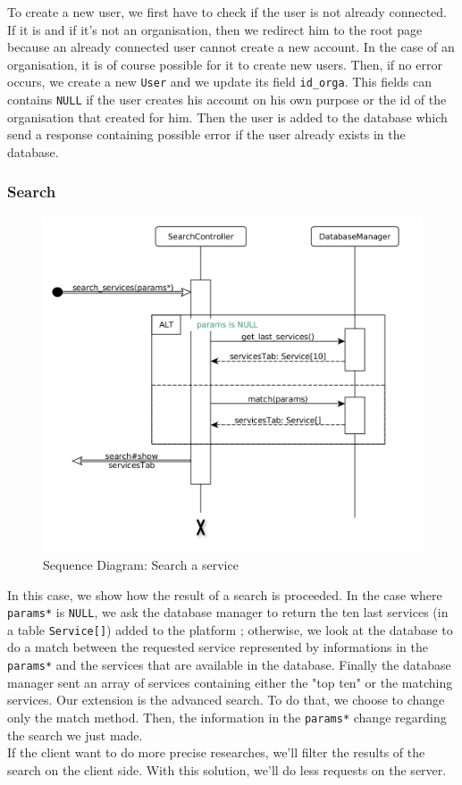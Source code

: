 To create a new user, we first have to check if the user is not already connected. If it is and if it's
not an organisation, then we redirect him to the root page because an already connected user cannot 
create a new account. In the case of an organisation, it is of course possible 
for it to create new users. Then, if no error occurs, we create a new \texttt{User} and we update its field \texttt{id\_orga}. This fields can contains \texttt{NULL} if the user creates his account on his own purpose or the id of the organisation that created for him. Then the user is added to the
database which send a response containing  possible error if the user already exists in the database.

\subsubsection{Search}

\begin{figure}[H]
	\begin{center}
		\includegraphics[width=.55\textwidth]{search_a_service.png} %
		\caption{Sequence Diagram: Search a service}
		\label{fig:searchservice}
	\end{center}
\end{figure}

In this case, we show how the result of a search is proceeded. In the case where \texttt{params*} is \texttt{NULL}, we ask the database manager to return the ten last services (in a table \texttt{Service[]}) added to the platform ;
otherwise, we look at the database to do a match between the requested service represented by informations in the \texttt{params*} and the services that are available in the database. Finally the database manager sent an array of services containing either the "top ten" or the matching services.
Our extension is the advanced search.  To do that, we choose to change only the match method.  Then, the information in the \texttt{params*} change regarding the search we just made. 
\\If the client want to do more precise researches, we'll filter the results of the search on the client side. With this solution, we'll do less requests on the server.

